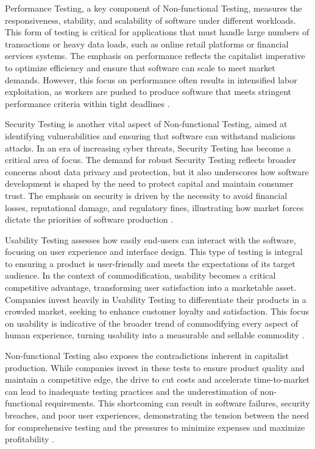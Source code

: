\begin{refsection}
Performance Testing, a key component of Non-functional Testing, measures the responsiveness, stability, and scalability of software under different workloads. This form of testing is critical for applications that must handle large numbers of transactions or heavy data loads, such as online retail platforms or financial services systems. The emphasis on performance reflects the capitalist imperative to optimize efficiency and ensure that software can scale to meet market demands. However, this focus on performance often results in intensified labor exploitation, as workers are pushed to produce software that meets stringent performance criteria within tight deadlines \cite[pp.~150-155]{fuchs2014digital}.

Security Testing is another vital aspect of Non-functional Testing, aimed at identifying vulnerabilities and ensuring that software can withstand malicious attacks. In an era of increasing cyber threats, Security Testing has become a critical area of focus. The demand for robust Security Testing reflects broader concerns about data privacy and protection, but it also underscores how software development is shaped by the need to protect capital and maintain consumer trust. The emphasis on security is driven by the necessity to avoid financial losses, reputational damage, and regulatory fines, illustrating how market forces dictate the priorities of software production \cite[pp.~145-149]{anderson2021security}.

Usability Testing assesses how easily end-users can interact with the software, focusing on user experience and interface design. This type of testing is integral to ensuring a product is user-friendly and meets the expectations of its target audience. In the context of commodification, usability becomes a critical competitive advantage, transforming user satisfaction into a marketable asset. Companies invest heavily in Usability Testing to differentiate their products in a crowded market, seeking to enhance customer loyalty and satisfaction. This focus on usability is indicative of the broader trend of commodifying every aspect of human experience, turning usability into a measurable and sellable commodity \cite[pp.~185-190]{norman1988design}.

Non-functional Testing also exposes the contradictions inherent in capitalist production. While companies invest in these tests to ensure product quality and maintain a competitive edge, the drive to cut costs and accelerate time-to-market can lead to inadequate testing practices and the underestimation of non-functional requirements. This shortcoming can result in software failures, security breaches, and poor user experiences, demonstrating the tension between the need for comprehensive testing and the pressures to minimize expenses and maximize profitability \cite[pp.~147-151]{braverman1974labor}.


\end{refsection}
